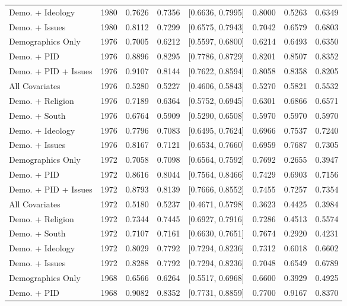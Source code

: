 \begin{longtable}{lrrrlrrr}
  Demo. + Ideology & 1980 & 0.7626 & 0.7356 & [0.6636, 0.7995] & 0.8000 & 0.5263 & 0.6349 \\ 
  Demo. + Issues & 1980 & 0.8112 & 0.7299 & [0.6575, 0.7943] & 0.7042 & 0.6579 & 0.6803 \\ 
  Demographics Only & 1976 & 0.7005 & 0.6212 & [0.5597, 0.6800] & 0.6214 & 0.6493 & 0.6350 \\ 
  Demo. + PID & 1976 & 0.8896 & 0.8295 & [0.7786, 0.8729] & 0.8201 & 0.8507 & 0.8352 \\ 
  Demo. + PID + Issues & 1976 & 0.9107 & 0.8144 & [0.7622, 0.8594] & 0.8058 & 0.8358 & 0.8205 \\ 
  All Covariates & 1976 & 0.5280 & 0.5227 & [0.4606, 0.5843] & 0.5270 & 0.5821 & 0.5532 \\ 
  Demo. + Religion & 1976 & 0.7189 & 0.6364 & [0.5752, 0.6945] & 0.6301 & 0.6866 & 0.6571 \\ 
  Demo. + South & 1976 & 0.6764 & 0.5909 & [0.5290, 0.6508] & 0.5970 & 0.5970 & 0.5970 \\ 
  Demo. + Ideology & 1976 & 0.7796 & 0.7083 & [0.6495, 0.7624] & 0.6966 & 0.7537 & 0.7240 \\ 
  Demo. + Issues & 1976 & 0.8167 & 0.7121 & [0.6534, 0.7660] & 0.6959 & 0.7687 & 0.7305 \\ 
  Demographics Only & 1972 & 0.7058 & 0.7098 & [0.6564, 0.7592] & 0.7692 & 0.2655 & 0.3947 \\ 
  Demo. + PID & 1972 & 0.8616 & 0.8044 & [0.7564, 0.8466] & 0.7429 & 0.6903 & 0.7156 \\ 
  Demo. + PID + Issues & 1972 & 0.8793 & 0.8139 & [0.7666, 0.8552] & 0.7455 & 0.7257 & 0.7354 \\ 
  All Covariates & 1972 & 0.5180 & 0.5237 & [0.4671, 0.5798] & 0.3623 & 0.4425 & 0.3984 \\ 
  Demo. + Religion & 1972 & 0.7344 & 0.7445 & [0.6927, 0.7916] & 0.7286 & 0.4513 & 0.5574 \\ 
  Demo. + South & 1972 & 0.7107 & 0.7161 & [0.6630, 0.7651] & 0.7674 & 0.2920 & 0.4231 \\ 
  Demo. + Ideology & 1972 & 0.8029 & 0.7792 & [0.7294, 0.8236] & 0.7312 & 0.6018 & 0.6602 \\ 
  Demo. + Issues & 1972 & 0.8288 & 0.7792 & [0.7294, 0.8236] & 0.7048 & 0.6549 & 0.6789 \\ 
  Demographics Only & 1968 & 0.6566 & 0.6264 & [0.5517, 0.6968] & 0.6600 & 0.3929 & 0.4925 \\ 
  Demo. + PID & 1968 & 0.9082 & 0.8352 & [0.7731, 0.8859] & 0.7700 & 0.9167 & 0.8370 \\ 

\end{longtable}
